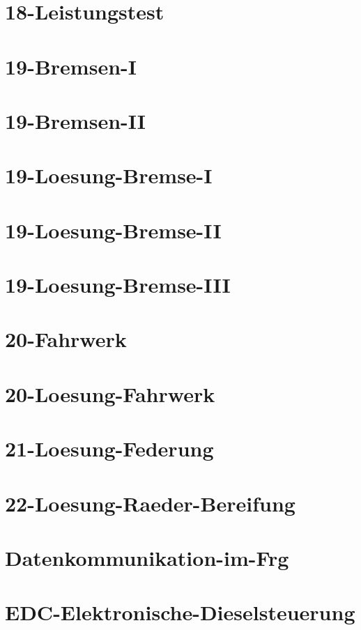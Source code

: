 \chapter{18-Leistungstest}
%
\chapter{19-Bremsen-I}
%
\chapter{19-Bremsen-II}
%
\chapter{19-Loesung-Bremse-I}
%
\chapter{19-Loesung-Bremse-II}
%
\chapter{19-Loesung-Bremse-III}
%
\chapter{20-Fahrwerk}
%
\chapter{20-Loesung-Fahrwerk}
%
\chapter{21-Loesung-Federung}
%
\chapter{22-Loesung-Raeder-Bereifung}
%
\chapter{Datenkommunikation-im-Frg}
%
\chapter{EDC-Elektronische-Dieselsteuerung}
%
